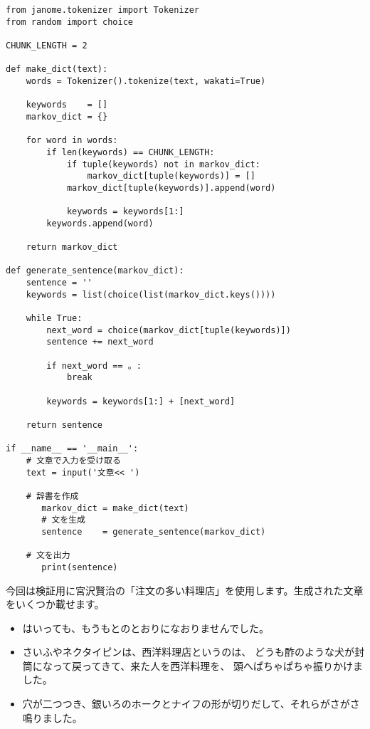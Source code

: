 \documentclass{jsarticle}
\begin{document}
            \begin{lstlisting}[caption=全体のコード]
from janome.tokenizer import Tokenizer
from random import choice
                
CHUNK_LENGTH = 2
                
def make_dict(text):
    words = Tokenizer().tokenize(text, wakati=True)

    keywords    = []
    markov_dict = {}

    for word in words:
        if len(keywords) == CHUNK_LENGTH:
            if tuple(keywords) not in markov_dict:
                markov_dict[tuple(keywords)] = []
            markov_dict[tuple(keywords)].append(word)
                
            keywords = keywords[1:]
        keywords.append(word)
                    
    return markov_dict
                
def generate_sentence(markov_dict):
    sentence = ''
    keywords = list(choice(list(markov_dict.keys())))

    while True:
        next_word = choice(markov_dict[tuple(keywords)])
        sentence += next_word

        if next_word == 。:
            break
                        
        keywords = keywords[1:] + [next_word]
                
    return sentence
                
if __name__ == '__main__':
    # 文章で入力を受け取る
    text = input('文章<< ')
                
    # 辞書を作成
       markov_dict = make_dict(text)
       # 文を生成
       sentence    = generate_sentence(markov_dict)
                
    # 文を出力
       print(sentence)
            \end{lstlisting}

            今回は検証用に宮沢賢治の「注文の多い料理店」を使用します。生成された文章をいくつか載せます。

            \begin{itemize}
                \item はいっても、もうもとのとおりになおりませんでした。
                \item さいふやネクタイピンは、西洋料理店というのは、
                      どうも酢のような犬が封筒になって戻ってきて、来た人を西洋料理を、
                      頭へぱちゃぱちゃ振りかけました。
                \item 穴が二つつき、銀いろのホークとナイフの形が切りだして、それらがさがさ鳴りました。
            \end{itemize}
\end{document}
